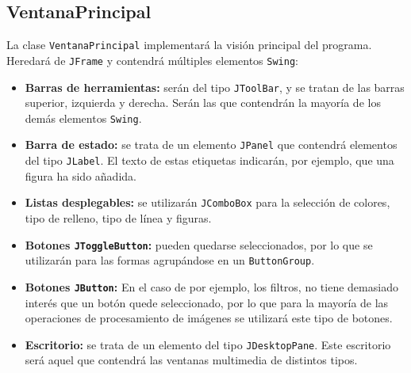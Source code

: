 \subsection{VentanaPrincipal}
La clase \texttt{VentanaPrincipal} implementará la visión principal del programa. Heredará de \texttt{JFrame} y contendrá múltiples elementos \texttt{Swing}:
\begin{itemize}
\item{\textbf{Barras de herramientas:} serán del tipo \texttt{JToolBar}, y se tratan de las barras superior, izquierda y derecha. Serán las que contendrán la mayoría de los demás elementos \texttt{Swing}.}
\item{\textbf{Barra de estado:} se trata de un elemento \texttt{JPanel} que contendrá elementos del tipo \texttt{JLabel}. El texto de estas etiquetas indicarán, por ejemplo, que una figura ha sido añadida.}
\item{\textbf{Listas desplegables:} se utilizarán \texttt{JComboBox} para la selección de colores, tipo de relleno, tipo de línea y figuras.}
\item{\textbf{Botones \texttt{JToggleButton}:} pueden quedarse seleccionados, por lo que se utilizarán para las formas agrupándose en un \texttt{ButtonGroup}.}
\item{\textbf{Botones \texttt{JButton}:} En el caso de por ejemplo, los filtros, no tiene demasiado interés que un botón quede seleccionado, por lo que para la mayoría de las operaciones de procesamiento de imágenes se utilizará este tipo de botones.}
\item{\textbf{Escritorio:} se trata de un elemento del tipo \texttt{JDesktopPane}. Este escritorio será aquel que contendrá las ventanas multimedia de distintos tipos.}
\end{itemize}
